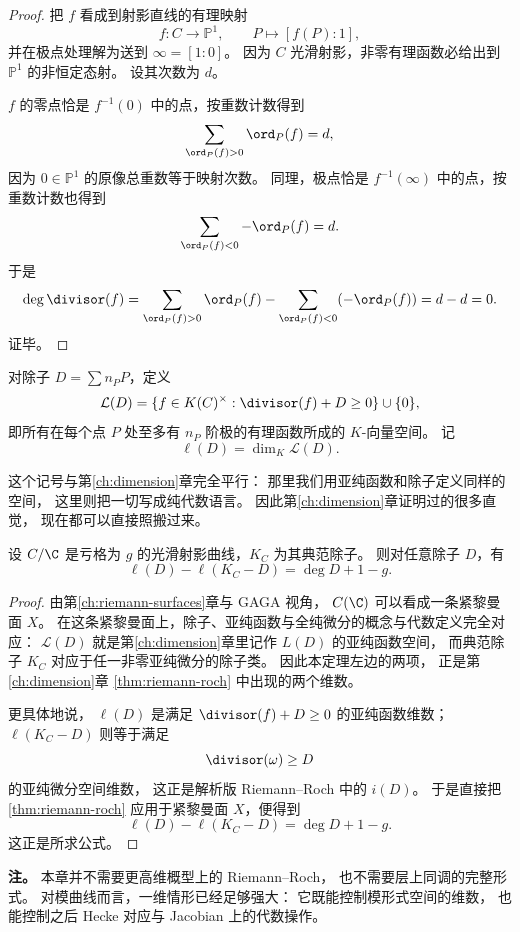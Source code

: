 \begin{proof}
把 $f$ 看成到射影直线的有理映射
\[
  f:C\longrightarrow \mathbb P^1,
  \qquad P\longmapsto [f(P):1],
\]
并在极点处理解为送到 $\infty=[1:0]$。
因为 $C$ 光滑射影，非零有理函数必给出到 $\mathbb P^1$ 的非恒定态射。
设其次数为 $d$。

$f$ 的零点恰是 $f^{-1}(0)$ 中的点，按重数计数得到
\[
  \sum_{\ord_P(f)>0} \ord_P(f)=d,
\]
因为 $0\in \mathbb P^1$ 的原像总重数等于映射次数。
同理，极点恰是 $f^{-1}(\infty)$ 中的点，按重数计数也得到
\[
  \sum_{\ord_P(f)<0} -\ord_P(f)=d.
\]
于是
\[
  \deg\divisor(f)
  =\sum_{\ord_P(f)>0}\ord_P(f)-\sum_{\ord_P(f)<0}(-\ord_P(f))
  =d-d=0.
\]
证毕。
\end{proof}

\begin{definition}
\label{def:ch07-l-of-d}
对除子 $D=\sum n_PP$，定义
\[
  \mathcal L(D)=\{f\in K(C)^\times:\divisor(f)+D\ge 0\}\cup\{0\},
\]
即所有在每个点 $P$ 处至多有 $n_P$ 阶极的有理函数所成的 $K$-向量空间。
记
\[
  \ell(D)=\dim_K \mathcal L(D).
\]
\end{definition}

这个记号与第\ref{ch:dimension}章完全平行：
那里我们用亚纯函数和除子定义同样的空间，
这里则把一切写成纯代数语言。
因此第\ref{ch:dimension}章证明过的很多直觉，
现在都可以直接照搬过来。

\begin{theorem}
\label{thm:ch07-algebraic-riemann-roch}
设 $C/\C$ 是亏格为 $g$ 的光滑射影曲线，$K_C$ 为其典范除子。
则对任意除子 $D$，有
\[
  \ell(D)-\ell(K_C-D)=\deg D+1-g.
\]
\end{theorem}

\begin{proof}
由第\ref{ch:riemann-surfaces}章与 GAGA 视角，
$C(\C)$ 可以看成一条紧黎曼面 $X$。
在这条紧黎曼面上，除子、亚纯函数与全纯微分的概念与代数定义完全对应：
$\mathcal L(D)$ 就是第\ref{ch:dimension}章里记作 $L(D)$ 的亚纯函数空间，
而典范除子 $K_C$ 对应于任一非零亚纯微分的除子类。
因此本定理左边的两项，
正是第\ref{ch:dimension}章 \cref{thm:riemann-roch} 中出现的两个维数。

更具体地说，
$\ell(D)$ 是满足 $\divisor(f)+D\ge 0$ 的亚纯函数维数；
$\ell(K_C-D)$ 则等于满足
\[
  \divisor(\omega)\ge D
\]
的亚纯微分空间维数，
这正是解析版 Riemann--Roch 中的 $i(D)$。
于是直接把 \cref{thm:riemann-roch} 应用于紧黎曼面 $X$，便得到
\[
  \ell(D)-\ell(K_C-D)=\deg D+1-g.
\]
这正是所求公式。
\end{proof}

\textbf{注。}
本章并不需要更高维概型上的 Riemann--Roch，
也不需要层上同调的完整形式。
对模曲线而言，一维情形已经足够强大：
它既能控制模形式空间的维数，
也能控制之后 Hecke 对应与 Jacobian 上的代数操作。

